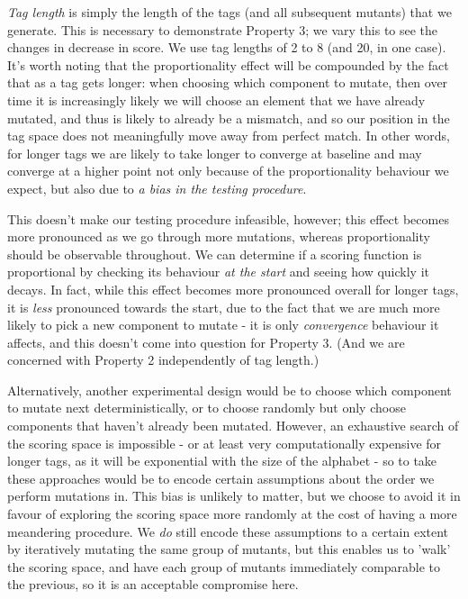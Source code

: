 \documentclass{l4proj}
\begin{document}
\textit{Tag length} is simply the length of the tags (and all subsequent mutants) that we generate. This is necessary to demonstrate Property 3; we vary this to see the changes in decrease in score. We use tag lengths of 2 to 8 (and 20, in one case). It's worth noting that the proportionality effect will be compounded by the fact that as a tag gets longer: when choosing which component to mutate, then over time it is increasingly likely we will choose an element that we have already mutated, and thus is likely to already be a mismatch, and so our position in the tag space does not meaningfully move away from perfect match. In other words, for longer tags we are likely to take longer to converge at baseline and may converge at a higher point not only because of the proportionality behaviour we expect, but also due to \textit{a bias in the testing procedure}. 

This doesn't make our testing procedure infeasible, however; this effect becomes more pronounced as we go through more mutations, whereas proportionality should be observable throughout. We can determine if a scoring function is proportional by checking its behaviour \textit{at the start} and seeing how quickly it decays. In fact, while this effect becomes more pronounced overall for longer tags, it is \textit{less} pronounced towards the start, due to the fact that we are much more likely to pick a new component to mutate - it is only \textit{convergence} behaviour it affects, and this doesn't come into question for Property 3. (And we are concerned with Property 2 independently of tag length.)

Alternatively, another experimental design would be to choose which component to mutate next deterministically, or to choose randomly but only choose components that haven't already been mutated. However, an exhaustive search of the scoring space is impossible - or at least very computationally expensive for longer tags, as it will be exponential with the size of the alphabet - so to take these approaches would be to encode certain assumptions about the order we perform mutations in. This bias is unlikely to matter, but we choose to avoid it in favour of exploring the scoring space more randomly at the cost of having a more meandering procedure. We \textit{do} still encode these assumptions to a certain extent by iteratively mutating the same group of mutants, but this enables us to 'walk' the scoring space, and have each group of mutants immediately comparable to the previous, so it is an acceptable compromise here.
\end{document}

